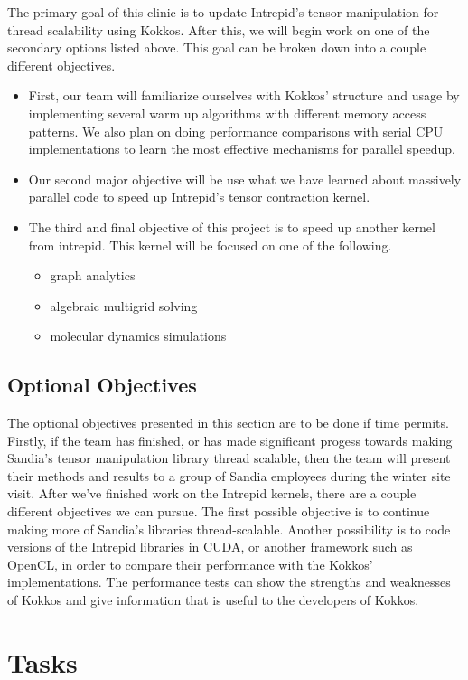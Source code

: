 \documentclass[proposal]{hmcclinic}
\begin{document}
The primary goal of this clinic is to update Intrepid's tensor
manipulation for thread scalability using Kokkos. After this, we will begin work
on one of the secondary options listed above. This goal can
be broken down into a couple different objectives. 
\begin{itemize}
\item First, our team will familiarize ourselves with Kokkos' structure and usage by 
implementing several warm up algorithms with different memory access patterns. 
We also plan on doing performance comparisons with serial CPU implementations
to learn the most effective mechanisms for parallel speedup. 
\item Our second major objective will be use what we have learned about massively parallel code to speed up Intrepid's tensor contraction kernel.  
\item The third and final objective of this project is to speed up another kernel from intrepid. 
This kernel will be focused on one of the following. 
	\begin{itemize}
		\item graph analytics
		\item algebraic multigrid solving
		\item molecular dynamics simulations
	\end{itemize}
\end{itemize}

\subsection{Optional Objectives}

The optional objectives presented in this section are to be done if time
permits. Firstly, if the team has finished, or has made significant progess
towards making Sandia's tensor manipulation library thread scalable, then the team will 
present their methods and results to a group of Sandia employees during the winter site visit.
 After we've finished work on the Intrepid kernels, there are a couple different objectives we can pursue.
The first possible objective is
to continue making more of Sandia's libraries thread-scalable. Another possibility is to code
versions of the Intrepid libraries in CUDA, or another
framework such as OpenCL, in order to compare their performance with the Kokkos'
implementations. The performance tests can show the strengths and weaknesses of
Kokkos and give information that is useful to the developers of Kokkos. 

\section{Tasks}
\end{document}
